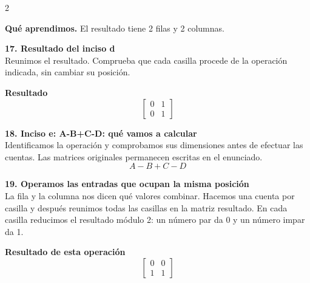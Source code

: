 \documentclass[11pt,a4paper,landscape]{article}
\begin{document}
\begin{multicols*}{2}
\begin{minipage}{\linewidth}
\par\smallskip\textbf{Qué aprendimos.} El resultado tiene 2 filas y 2 columnas.
\end{minipage}\par\medskip
\noindent\begin{minipage}{\linewidth}\textbf{17. Resultado del inciso d}\\[2pt]Reunimos el resultado. Comprueba que cada casilla procede de la operación indicada, sin cambiar su posición.
\par\smallskip \textbf{Resultado}\[\begin{bmatrix}0 & 1\\0 & 1\end{bmatrix}\]
\end{minipage}\par\medskip
\noindent\begin{minipage}{\linewidth}\textbf{18. Inciso e: A-B+C-D: qué vamos a calcular}\\[2pt]Identificamos la operación y comprobamos sus dimensiones antes de efectuar las cuentas. Las matrices originales permanecen escritas en el enunciado.
\[A-B+C-D\]
\end{minipage}\par\medskip
\noindent\begin{minipage}{\linewidth}\textbf{19. Operamos las entradas que ocupan la misma posición}\\[2pt]La fila y la columna nos dicen qué valores combinar. Hacemos una cuenta por casilla y después reunimos todas las casillas en la matriz resultado. En cada casilla reducimos el resultado módulo 2: un número par da 0 y un número impar da 1.
\par{}\par\smallskip
\par\smallskip \textbf{Resultado de esta operación}\[\begin{bmatrix}0 & 0\\1 & 1\end{bmatrix}\]

\end{minipage}
\end{multicols*}
\end{document}
